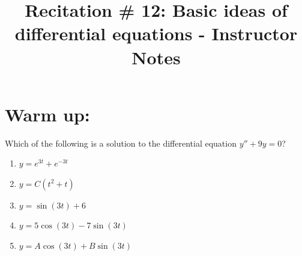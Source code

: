 \documentclass[handout, instructornotes]{ximera}
\title{Recitation \# 12: Basic ideas of differential equations - Instructor Notes}
\begin{document}
\begin{abstract}		\end{abstract}
\maketitle




\section{Warm up:}

Which of the following is a solution to the differential equation $y'' + 9y = 0$?
	\begin{enumerate}
	\item  $y=e^{3t}+e^{-3t}$
	\item  $y=C(t^2 + t)$
	\item  $y=\sin(3t) + 6$
	\item  $y=5 \cos(3t) - 7 \sin(3t)$
	\item  $y=A \cos(3t) + B \sin(3t)$ 
	\end{enumerate}
	
\end{document}
